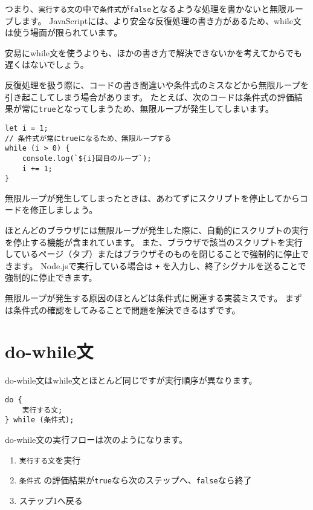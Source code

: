 つまり、\texttt{実行する文}の中で\texttt{条件式}が\texttt{false}となるような処理を書かないと無限ループします。
JavaScriptには、より安全な反復処理の書き方があるため、while文は使う場面が限られています。

安易にwhile文を使うよりも、ほかの書き方で解決できないかを考えてからでも遅くはないでしょう。

\begin{tcolorbox}[title=無限ループ]\label{inifinite-loop}

反復処理を扱う際に、コードの書き間違いや条件式のミスなどから無限ループを引き起こしてしまう場合があります。
たとえば、次のコードは条件式の評価結果が常に\texttt{true}となってしまうため、無限ループが発生してしまいます。

\begin{lstlisting}
let i = 1;
// 条件式が常にtrueになるため、無限ループする
while (i > 0) {
    console.log(`${i}回目のループ`);
    i += 1;
}
\end{lstlisting}

無限ループが発生してしまったときは、あわてずにスクリプトを停止してからコードを修正しましょう。

ほとんどのブラウザには無限ループが発生した際に、自動的にスクリプトの実行を停止する機能が含まれています。
また、ブラウザで該当のスクリプトを実行しているページ（タブ）またはブラウザそのものを閉じることで強制的に停止できます。
Node.jsで実行している場合は \texttt{+} を入力し、終了シグナルを送ることで強制的に停止できます。

無限ループが発生する原因のほとんどは条件式に関連する実装ミスです。
まずは条件式の確認をしてみることで問題を解決できるはずです。
\end{tcolorbox}

\hypertarget{do-while-statement}{%
\section{do-while文}\label{do-while-statement}}

do-while文はwhile文とほとんど同じですが実行順序が異なります。

\begin{lstlisting}
do {
    実行する文;
} while (条件式);
\end{lstlisting}

do-while文の実行フローは次のようになります。

\begin{enumerate}
\def\labelenumi{\arabic{enumi}.}
\item
  \texttt{実行する文}を実行
\item
  \texttt{条件式}
  の評価結果が\texttt{true}なら次のステップへ、\texttt{false}なら終了
\item
  ステップ1へ戻る
\end{enumerate}

